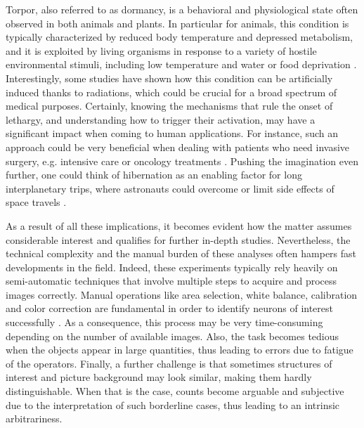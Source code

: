 Torpor, also referred to as dormancy, is a behavioral and physiological state often observed in both animals and plants. 
In particular for animals, this condition is typically characterized by reduced body temperature and depressed metabolism, and it is exploited by living organisms in response to a variety of hostile environmental stimuli, including low temperature and water or food deprivation \cite{GANSLOER2019328, WITHERS2019309}.
Interestingly, some studies have shown how this condition can be artificially induced thanks to radiations, which could be crucial for a broad spectrum of medical purposes.
Certainly,
knowing the mechanisms that rule the onset of lethargy, and understanding how to trigger their activation,  may have a significant impact when coming to human applications.
For instance, such an approach could be very beneficial when dealing with patients who need invasive surgery, e.g. intensive care or oncology treatments \cite{bouma2012induction, alam2012hypothermia, bellamy1996suspended}.
Pushing the imagination even further, one could think of hibernation as an enabling factor for long interplanetary trips, where astronauts could overcome or limit side effects of space travels \cite{CERRI20161, CERRI2021218, bradford2020aerospace}.

As a result of all these implications, it becomes evident how the matter assumes considerable interest and qualifies for further in-depth studies.
Nevertheless, the technical complexity and the manual burden of these analyses often hampers fast developments in the field.
Indeed, these experiments typically rely heavily on semi-automatic techniques that involve multiple steps to acquire and process images correctly.  
Manual operations like area selection, white balance, calibration and color correction are fundamental in order to identify neurons of interest successfully \cite{luppi1, luppi2, luppi3}. 
As a consequence, this process may be very time-consuming depending on the number of available images. 
Also, the task becomes tedious when the objects appear in large quantities, thus leading to errors due to fatigue of the operators.
Finally, a further challenge is that sometimes structures of interest and picture background may look similar, making them hardly distinguishable. When that is the case, counts become arguable and subjective due to the interpretation of such borderline cases, thus leading to an intrinsic arbitrariness.

